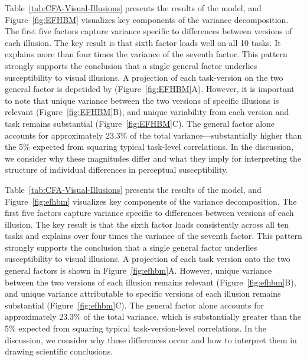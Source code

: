Table~\ref{tab:CFA-Visual-Illusions} presents the results of the model, and Figure~\ref{fig:EFHBM} visualizes key components of the variance decomposition. The first five factors capture variance specific to differences between versions of each illusion. The key result is that sixth factor loads well on all 10 tasks.  It explains more than four times the variance of the seventh factor. This pattern strongly supports the conclusion that a single general factor underlies susceptibility to visual illusions. A projection of each task-version on the two general factor is depctided by (Figure~\ref{fig:EFHBM}A). However, it is important to note that unique variance between the two versions of specific illusions is relevant (Figure~\ref{fig:EFHBM}B), and unique variability from each version and task  remains substantial (Figure~\ref{fig:EFHBM}C). The general factor alone accounts for approximately 23.3\% of the total variance—substantially higher than the 5\% expected from squaring typical task-level correlations. In the discussion, we consider why these magnitudes differ and what they imply for interpreting the structure of individual differences in perceptual susceptibility.


Table~\ref{tab:CFA-Visual-Illusions} presents the results of the model, and Figure~\ref{fig:efhbm} visualizes key components of the variance decomposition. The first five factors capture variance specific to differences between versions of each illusion. The key result is that the sixth factor loads consistently across all ten tasks and explains over four times the variance of the seventh factor. This pattern strongly supports the conclusion that a single general factor underlies susceptibility to visual illusions. A projection of each task version onto the two general factors is shown in Figure~\ref{fig:efhbm}A. However, unique variance between the two versions of each illusion remains relevant (Figure~\ref{fig:efhbm}B), and unique variance attributable to specific versions of each illusion remains substantial (Figure~\ref{fig:efhbm}C). The general factor alone accounts for approximately 23.3\% of the total variance, which is substantially greater than the 5\% expected from squaring typical task-version-level correlations. In the discussion, we consider why these differences occur and how to interpret them in drawing scientific conclusions.


